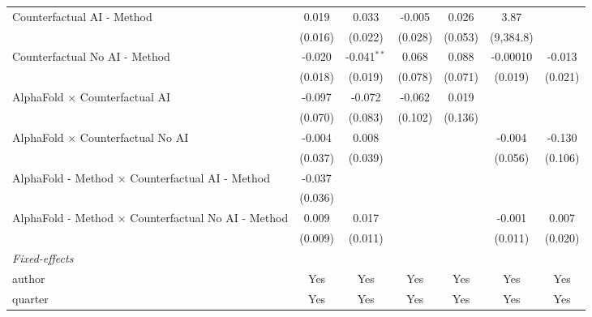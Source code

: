 \begin{tabular}{lcccccc}
   Counterfactual AI - Method                                 & 0.019   & 0.033         & -0.005         & 0.026          & 3.87      &   \\   
                                                              & (0.016) & (0.022)       & (0.028)        & (0.053)        & (9,384.8) &   \\   
   Counterfactual No AI - Method                              & -0.020  & -0.041$^{**}$ & 0.068          & 0.088          & -0.00010  & -0.013\\   
                                                              & (0.018) & (0.019)       & (0.078)        & (0.071)        & (0.019)   & (0.021)\\   
   AlphaFold $\times$ Counterfactual AI                       & -0.097  & -0.072        & -0.062         & 0.019          &           &   \\   
                                                              & (0.070) & (0.083)       & (0.102)        & (0.136)        &           &   \\   
   AlphaFold $\times$ Counterfactual No AI                    & -0.004  & 0.008         &                &                & -0.004    & -0.130\\   
                                                              & (0.037) & (0.039)       &                &                & (0.056)   & (0.106)\\   
   AlphaFold - Method $\times$ Counterfactual AI - Method     & -0.037  &               &                &                &           &   \\   
                                                              & (0.036) &               &                &                &           &   \\   
   AlphaFold - Method $\times$ Counterfactual No AI - Method  & 0.009   & 0.017         &                &                & -0.001    & 0.007\\   
                                                              & (0.009) & (0.011)       &                &                & (0.011)   & (0.020)\\   
   \midrule
   \emph{Fixed-effects}\\
   author                                                     & Yes     & Yes           & Yes            & Yes            & Yes       & Yes\\  
   quarter                                                    & Yes     & Yes           & Yes            & Yes            & Yes       & Yes\\  

\end{tabular}
